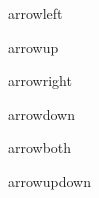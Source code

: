 \documentclass[11pt]{article}
\title{}
\author{Dave Davey}
\begin{document}
\maketitle

\normalsize{
arrowleft\par
}
arrowup\par

arrowright\par

arrowdown\par

arrowboth\par

arrowupdown\par
\end{document}
